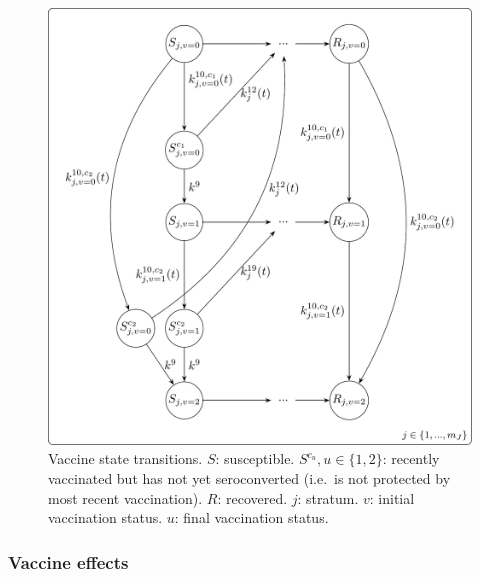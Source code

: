 \documentclass[
]{article}
\begin{document}
\begin{figure}
\centering
\includegraphics{README_files/figure-latex/vaccinetransitions-1.png}
\caption{\label{fig:vaccinetransitions}Vaccine state transitions. \(S\): susceptible. \(S^{c_u}, u\in\{1,2\}\): recently vaccinated but has not yet seroconverted (i.e.~is not protected by most recent vaccination). \(R\): recovered. \(j\): stratum. \(v\): initial vaccination status. \(u\): final vaccination status.}
\end{figure}

\subsubsection{Vaccine effects}\label{vaccine-effects}
\end{document}
